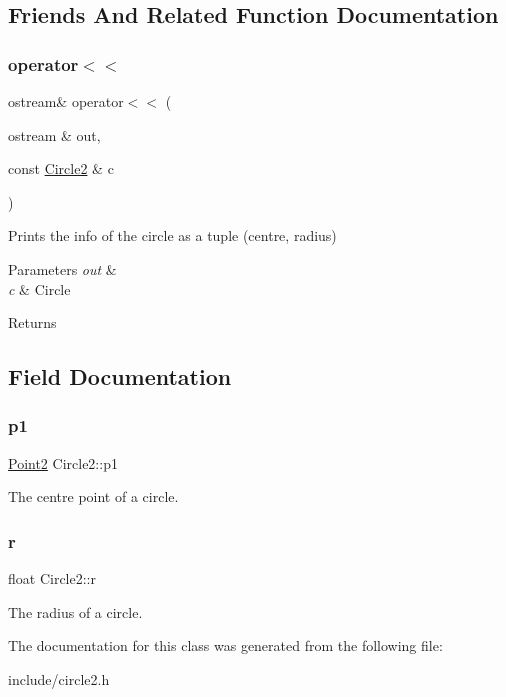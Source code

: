 \subsection{Friends And Related Function Documentation}
\mbox{\label{class_circle2_a4ccba61b3b68a4c389c0ec160f975b2b}} 
\subsubsection{\texorpdfstring{operator$<$$<$}{operator<<}}
{\footnotesize\ttfamily ostream\& operator$<$$<$ (\begin{DoxyParamCaption}\item[{ostream \&}]{out,  }\item[{const \mbox{\hyperlink{class_circle2}{Circle2}} \&}]{c }\end{DoxyParamCaption})\hspace{0.3cm}{\ttfamily [friend]}}



Prints the info of the circle as a tuple (centre, radius) 


\begin{DoxyParams}{Parameters}
{\em out} & \\
\hline
{\em c} & Circle \\
\hline
\end{DoxyParams}
\begin{DoxyReturn}{Returns}

\end{DoxyReturn}


\subsection{Field Documentation}
\mbox{\label{class_circle2_ae041646719f802ae427599e07a61a513}} 
\subsubsection{\texorpdfstring{p1}{p1}}
{\footnotesize\ttfamily \mbox{\hyperlink{class_point2}{Point2}} Circle2\+::p1}



The centre point of a circle. 

\mbox{\label{class_circle2_a3529394e7c9960e081b726fb9f7a27cb}} 
\subsubsection{\texorpdfstring{r}{r}}
{\footnotesize\ttfamily float Circle2\+::r}



The radius of a circle. 



The documentation for this class was generated from the following file\+:\begin{DoxyCompactItemize}
\item 
include/circle2.\+h\end{DoxyCompactItemize}
